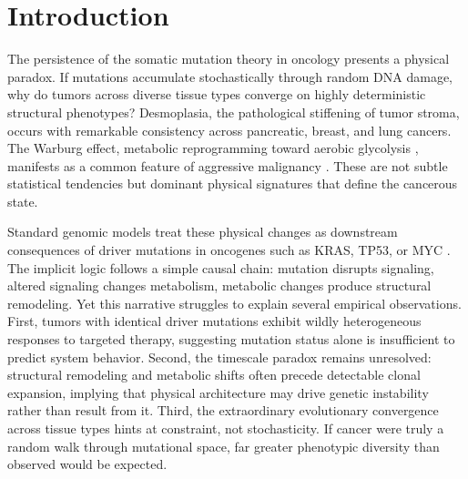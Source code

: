 \documentclass[11pt,letterpaper]{article}
\begin{document}
\clearpage


\section{Introduction}

The persistence of the somatic mutation theory in oncology presents a physical paradox. If mutations accumulate stochastically through random DNA damage, why do tumors across diverse tissue types converge on highly deterministic structural phenotypes? Desmoplasia, the pathological stiffening of tumor stroma, occurs with remarkable consistency across pancreatic, breast, and lung cancers. The Warburg effect, metabolic reprogramming toward aerobic glycolysis \cite{Warburg1956}, manifests as a common feature of aggressive malignancy \cite{Hanahan2011}. These are not subtle statistical tendencies but dominant physical signatures that define the cancerous state.

Standard genomic models treat these physical changes as downstream consequences of driver mutations in oncogenes such as KRAS, TP53, or MYC \cite{Weinberg2013,Vogelstein2013}. The implicit logic follows a simple causal chain: mutation disrupts signaling, altered signaling changes metabolism, metabolic changes produce structural remodeling. Yet this narrative struggles to explain several empirical observations. First, tumors with identical driver mutations exhibit wildly heterogeneous responses to targeted therapy, suggesting mutation status alone is insufficient to predict system behavior. Second, the timescale paradox remains unresolved: structural remodeling and metabolic shifts often precede detectable clonal expansion, implying that physical architecture may drive genetic instability rather than result from it. Third, the extraordinary evolutionary convergence across tissue types hints at constraint, not stochasticity. If cancer were truly a random walk through mutational space, far greater phenotypic diversity than observed would be expected.
\end{document}
